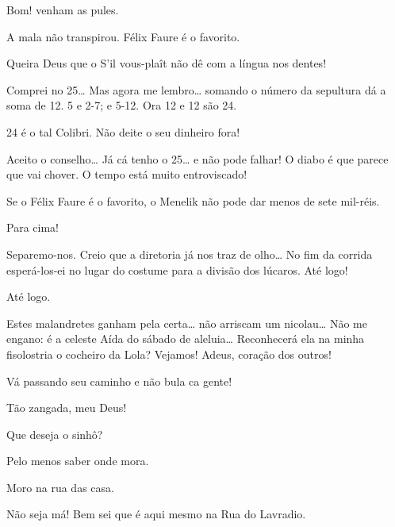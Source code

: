 
 Bom! venham as pules. 

 A mala não transpirou. Félix Faure é o favorito.

 Queira Deus que o S’il vous-plaît não dê com a língua nos dentes!

  Comprei no 25\ldots{} Mas agora me lembro\ldots{}
somando o número da sepultura dá a soma de 12. 5 e 2-7; e 5-12. Ora 12 e 12 são 24.

 24 é o tal Colibri. Não deite o seu dinheiro fora!

 Aceito o conselho\ldots{} Já cá tenho o 25\ldots{} e não pode
falhar! O diabo é que parece que vai chover. O tempo está muito entroviscado!

  Se o Félix Faure é o favorito, o
Menelik não pode dar menos de sete mil-réis.

 Para cima!

 Separemo-nos. Creio que a diretoria já nos traz de olho\ldots{} No
fim da corrida esperá-los-ei no lugar do costume para a divisão dos lúcaros. Até
logo!

 Até logo. 


  Estes malandretes ganham pela certa\ldots{} não arriscam
um nicolau\ldots{}  Não me engano: é a celeste Aída do sábado de 
aleluia\ldots{} Reconhecerá ela na minha fisolostria o cocheiro da Lola?
Vejamos!  Adeus, coração dos outros!

 Vá passando seu caminho e não bula ca gente!

 Tão zangada, meu Deus!

 Que deseja o sinhô?

 Pelo menos saber onde mora.

 Moro na rua das casa.

 Não seja má! Bem sei que é aqui mesmo na Rua do Lavradio.

